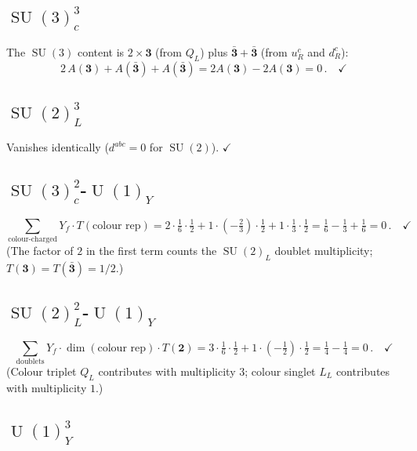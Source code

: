 \documentclass[12pt,a4paper]{article}
\theoremstyle{definition}
\newcommand{\SU}{\operatorname{SU}}
\newcommand{\U}{\operatorname{U}}
\begin{document}
\subsection{\texorpdfstring{$\SU(3)_c^3$}{SU(3)c³}}

The $\SU(3)$ content is $2 \times \mathbf{3}$ (from $Q_L$) plus $\mathbf{\bar{3}} + \mathbf{\bar{3}}$ (from $u_R^c$ and $d_R^c$):
\begin{equation}
2\, A(\mathbf{3}) + A(\bar{\mathbf{3}}) + A(\bar{\mathbf{3}}) = 2A(\mathbf{3}) - 2A(\mathbf{3}) = 0\,. \quad\checkmark
\end{equation}

\subsection{\texorpdfstring{$\SU(2)_L^3$}{SU(2)L³}}

Vanishes identically ($d^{abc} = 0$ for $\SU(2)$). $\checkmark$

\subsection{\texorpdfstring{$\SU(3)_c^2$-$\U(1)_Y$}{SU(3)c²-U(1)Y}}

\begin{equation}
\sum_{\text{colour-charged}} Y_f \cdot T(\text{colour rep}) = 2 \cdot \tfrac{1}{6} \cdot \tfrac{1}{2} + 1 \cdot (-\tfrac{2}{3}) \cdot \tfrac{1}{2} + 1 \cdot \tfrac{1}{3} \cdot \tfrac{1}{2} = \tfrac{1}{6} - \tfrac{1}{3} + \tfrac{1}{6} = 0\,. \quad\checkmark
\end{equation}
(The factor of $2$ in the first term counts the $\SU(2)_L$ doublet multiplicity; $T(\mathbf{3}) = T(\bar{\mathbf{3}}) = 1/2$.)

\subsection{\texorpdfstring{$\SU(2)_L^2$-$\U(1)_Y$}{SU(2)L²-U(1)Y}}

\begin{equation}
\sum_{\text{doublets}} Y_f \cdot \dim(\text{colour rep}) \cdot T(\mathbf{2}) = 3 \cdot \tfrac{1}{6} \cdot \tfrac{1}{2} + 1 \cdot (-\tfrac{1}{2}) \cdot \tfrac{1}{2} = \tfrac{1}{4} - \tfrac{1}{4} = 0\,. \quad\checkmark
\end{equation}
(Colour triplet $Q_L$ contributes with multiplicity $3$; colour singlet $L_L$ contributes with multiplicity $1$.)

\subsection{\texorpdfstring{$\U(1)_Y^3$}{U(1)Y³}}
\end{document}
